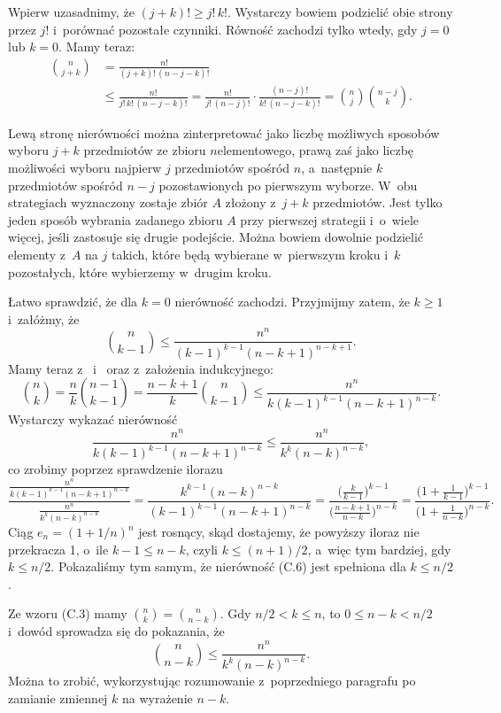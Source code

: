 \exercise %
Wpierw uzasadnimy, że $(j+k)!\ge j!\,k!$.
Wystarczy bowiem podzielić obie strony przez $j!$ i~porównać pozostałe czynniki.
Równość zachodzi tylko wtedy, gdy $j=0$ lub $k=0$.
Mamy teraz:
\begin{align*}
	\binom{n}{j+k} &= \frac{n!}{(j+k)!\,(n-j-k)!} \\
	&\le \frac{n!}{j!\,k!\,(n-j-k)!} = \frac{n!}{j!\,(n-j)!}\cdot\frac{(n-j)!}{k!\,(n-j-k)!} = \binom{n}{j}\binom{n-j}{k}.
\end{align*}

Lewą stronę nierówności można zinterpretować jako liczbę możliwych sposobów wyboru $j+k$ przedmiotów ze zbioru $n$\nbhyphen elementowego, prawą zaś jako liczbę możliwości wyboru najpierw $j$ przedmiotów spośród $n$, a~następnie $k$ przedmiotów spośród $n-j$ pozostawionych po pierwszym wyborze.
W~obu strategiach wyznaczony zostaje zbiór $A$ złożony z~$j+k$ przedmiotów.
Jest tylko jeden sposób wybrania zadanego zbioru $A$ przy pierwszej strategii i~o~wiele więcej, jeśli zastosuje się drugie podejście.
Można bowiem dowolnie podzielić elementy z~$A$ na $j$ takich, które będą wybierane w~pierwszym kroku i~$k$ pozostałych, które wybierzemy w~drugim kroku.

\exercise %
Łatwo sprawdzić, że dla $k=0$ nierówność zachodzi.
Przyjmijmy zatem, że $k\ge1$ i~załóżmy, że
\[
	\binom{n}{k-1} \le \frac{n^n}{(k-1)^{k-1}(n-k+1)^{n-k+1}}.
\]
Mamy teraz z~ i~ oraz z~założenia indukcyjnego:
\[
	\binom{n}{k} = \frac{n}{k}\binom{n-1}{k-1} = \frac{n-k+1}{k}\binom{n}{k-1} \le \frac{n^n}{k(k-1)^{k-1}(n-k+1)^{n-k}}.
\]
Wystarczy wykazać nierówność
\[
	\frac{n^n}{k(k-1)^{k-1}(n-k+1)^{n-k}} \le \frac{n^n}{k^k(n-k)^{n-k}},
\]
co zrobimy poprzez sprawdzenie ilorazu
\[
	\frac{\frac{n^n}{k(k-1)^{k-1}(n-k+1)^{n-k}}}{\frac{n^n}{k^k(n-k)^{n-k}}} = \frac{k^{k-1}(n-k)^{n-k}}{(k-1)^{k-1}(n-k+1)^{n-k}} = \frac{\bigl(\frac{k}{k-1}\bigr)^{k-1}}{\bigl(\frac{n-k+1}{n-k}\bigr)^{n-k}} = \frac{\bigl(1+\frac{1}{k-1}\bigr)^{k-1}}{\bigl(1+\frac{1}{n-k}\bigr)^{n-k}}.
\]
Ciąg $e_n={(1+1/n)}^n$ jest rosnący, skąd dostajemy, że powyższy iloraz nie przekracza 1, o~ile $k-1\le n-k$, czyli $k\le(n+1)/2$, a~więc tym bardziej, gdy $k\le n/2$.
Pokazaliśmy tym samym, że nierówność (C.6) jest spełniona dla $k\le n/2$.

Ze wzoru (C.3) mamy $\binom{n}{k}=\binom{n}{n-k}$.
Gdy $n/2<k\le n$, to $0\le n-k<n/2$ i~dowód sprowadza się do pokazania, że
\[
	\binom{n}{n-k} \le \frac{n^n}{k^k(n-k)^{n-k}}.
\]
Można to zrobić, wykorzystując rozumowanie z~poprzedniego paragrafu po zamianie zmiennej $k$ na wyrażenie $n-k$.

